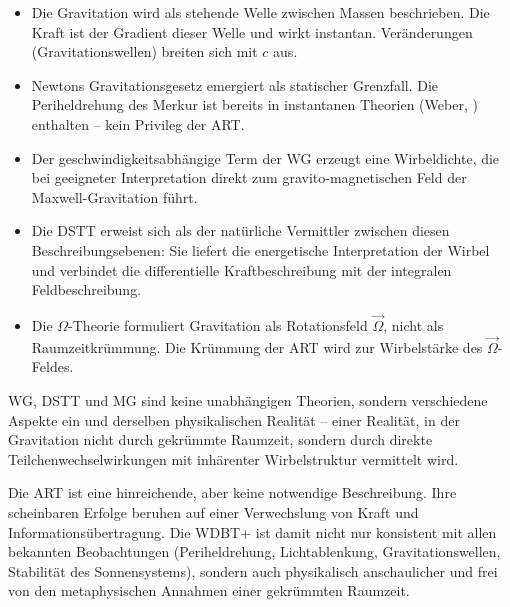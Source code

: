 \begin{itemize}
    \item Die Gravitation wird als stehende Welle zwischen Massen beschrieben. Die Kraft ist der Gradient dieser Welle und wirkt instantan. Veränderungen (Gravitationswellen) breiten sich mit \( c \) aus.
    \item Newtons Gravitationsgesetz emergiert als statischer Grenzfall. Die Periheldrehung des Merkur ist bereits in instantanen Theorien (Weber, \cite{Tisserand1894}) enthalten – kein Privileg der ART.
    \item Der geschwindigkeitsabhängige Term der WG erzeugt eine Wirbeldichte, die bei geeigneter Interpretation direkt zum gravito-magnetischen Feld der Maxwell-Gravitation führt.
    \item Die DSTT erweist sich als der natürliche Vermittler zwischen diesen Beschreibungsebenen: Sie liefert die energetische Interpretation der Wirbel und verbindet die differentielle Kraftbeschreibung mit der integralen Feldbeschreibung.
    \item Die \( \Omega \)-Theorie formuliert Gravitation als Rotationsfeld \( \vec{\Omega} \), nicht als Raumzeitkrümmung. Die Krümmung der ART wird zur Wirbelstärke des \( \vec{\Omega} \)-Feldes.
\end{itemize}

WG, DSTT und MG sind keine unabhängigen Theorien, sondern verschiedene Aspekte ein und derselben physikalischen Realität – einer Realität, in der Gravitation nicht durch gekrümmte Raumzeit, sondern durch direkte Teilchenwechselwirkungen mit inhärenter Wirbelstruktur vermittelt wird.

Die ART ist eine hinreichende, aber keine notwendige Beschreibung. Ihre scheinbaren Erfolge beruhen auf einer Verwechslung von Kraft und Informationsübertragung. Die WDBT+ ist damit nicht nur konsistent mit allen bekannten Beobachtungen (Periheldrehung, Lichtablenkung, Gravitationswellen, Stabilität des Sonnensystems), sondern auch physikalisch anschaulicher und frei von den metaphysischen Annahmen einer gekrümmten Raumzeit.